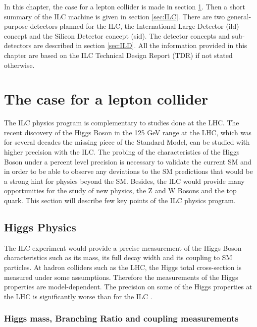 In this chapter, the case for a lepton collider is made in section \ref{sec:ILC_Physics}. Then a short summary of the ILC machine is given in section \ref{sec:ILC}. There are two general-purpose detectors planned for the ILC, the International Large Detector (\acrshort{ild}) concept and the Silicon Detector concept (\acrshort{sid}). The detector concepts and sub-detectors are described in section \ref{sec:ILD}. All the information provided in this chapter are based on the ILC Technical Design Report (TDR) \cite{ILC_TDR_Vol1, ILC_TDR_Vol2, ILC_TDR_Vol3.1, ILC_TDR_Vol3.2, ILC_TDR_Vol4} if not stated otherwise.

\section{The case for a lepton collider}
\label{sec:ILC_Physics}

The ILC physics program is complementary to studies done at the LHC. The recent discovery of the Higgs Boson in the 125 GeV range at the LHC, which was for several decades the missing piece of the Standard Model, can be studied with higher precision with the ILC. The probing of the characteristics of the Higgs Boson under a percent level precision is necessary to validate the current SM and in order to be able to observe any deviations to the SM predictions that would be a strong hint for physics beyond the SM. Besides, the ILC would provide many opportunities for the study of new physics, the Z and W Bosons and the top quark. This section will describe few key points of the ILC physics program.

\subsection{Higgs Physics}

The ILC experiment would provide a precise measurement of the Higgs Boson characteristics such as its mass, its full decay width and its coupling to SM particles. At hadron colliders such as the LHC, the Higgs total cross-section is measured under some assumptions. Therefore the measurements of the Higgs properties are model-dependent. The precision on some of the Higgs properties at the LHC is significantly worse than for the ILC \cite{Fujii:2015jha}.

\subsubsection{Higgs mass, Branching Ratio and coupling measurements}

